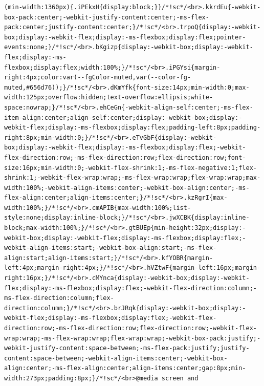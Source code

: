 \documentclass[
  letterpaper,
]{book}
\begin{document}
\begin{verbatim}
(min-width:1360px){.iPEkxH{display:block;}}/*!sc*/<br>.kkrdEu{-webkit-box-pack:center;-webkit-justify-content:center;-ms-flex-pack:center;justify-content:center;}/*!sc*/<br>.trpoQ{display:-webkit-box;display:-webkit-flex;display:-ms-flexbox;display:flex;pointer-events:none;}/*!sc*/<br>.bKgizp{display:-webkit-box;display:-webkit-flex;display:-ms-flexbox;display:flex;width:100%;}/*!sc*/<br>.iPGYsi{margin-right:4px;color:var(--fgColor-muted,var(--color-fg-muted,#656d76));}/*!sc*/<br>.dKmYfk{font-size:14px;min-width:0;max-width:125px;overflow:hidden;text-overflow:ellipsis;white-space:nowrap;}/*!sc*/<br>.ehCeGn{-webkit-align-self:center;-ms-flex-item-align:center;align-self:center;display:-webkit-box;display:-webkit-flex;display:-ms-flexbox;display:flex;padding-left:8px;padding-right:8px;min-width:0;}/*!sc*/<br>.eTvGbF{display:-webkit-box;display:-webkit-flex;display:-ms-flexbox;display:flex;-webkit-flex-direction:row;-ms-flex-direction:row;flex-direction:row;font-size:16px;min-width:0;-webkit-flex-shrink:1;-ms-flex-negative:1;flex-shrink:1;-webkit-flex-wrap:wrap;-ms-flex-wrap:wrap;flex-wrap:wrap;max-width:100%;-webkit-align-items:center;-webkit-box-align:center;-ms-flex-align:center;align-items:center;}/*!sc*/<br>.kzRgrI{max-width:100%;}/*!sc*/<br>.cmAPIB{max-width:100%;list-style:none;display:inline-block;}/*!sc*/<br>.jwXCBK{display:inline-block;max-width:100%;}/*!sc*/<br>.gtBUEp{min-height:32px;display:-webkit-box;display:-webkit-flex;display:-ms-flexbox;display:flex;-webkit-align-items:start;-webkit-box-align:start;-ms-flex-align:start;align-items:start;}/*!sc*/<br>.kfYOBR{margin-left:4px;margin-right:4px;}/*!sc*/<br>.hVZtwF{margin-left:16px;margin-right:16px;}/*!sc*/<br>.cMYnca{display:-webkit-box;display:-webkit-flex;display:-ms-flexbox;display:flex;-webkit-flex-direction:column;-ms-flex-direction:column;flex-direction:column;}/*!sc*/<br>.brJRqk{display:-webkit-box;display:-webkit-flex;display:-ms-flexbox;display:flex;-webkit-flex-direction:row;-ms-flex-direction:row;flex-direction:row;-webkit-flex-wrap:wrap;-ms-flex-wrap:wrap;flex-wrap:wrap;-webkit-box-pack:justify;-webkit-justify-content:space-between;-ms-flex-pack:justify;justify-content:space-between;-webkit-align-items:center;-webkit-box-align:center;-ms-flex-align:center;align-items:center;gap:8px;min-width:273px;padding:8px;}/*!sc*/<br>@media screen and 
\end{verbatim}
\end{document}
